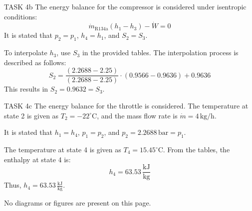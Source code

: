 TASK 4b  
The energy balance for the compressor is considered under isentropic conditions:  
\[
\dot{m}_{\text{R134a}} (h_1 - h_3) - \dot{W} = 0
\]  
It is stated that \( p_2 = p_1 \), \( h_4 = h_1 \), and \( S_2 = S_3 \).  

To interpolate \( h_3 \), use \( S_3 \) in the provided tables. The interpolation process is described as follows:  
\[
S_2 = \frac{(2.2688 - 2.25)}{(2.2688 - 2.25)} \cdot (0.9566 - 0.9636) + 0.9636
\]  
This results in \( S_2 = 0.9632 = S_3 \).  

TASK 4c  
The energy balance for the throttle is considered. The temperature at state 2 is given as \( T_2 = -22^\circ\text{C} \), and the mass flow rate is \( \dot{m} = 4 \, \text{kg/h} \).  

It is stated that \( h_1 = h_4 \), \( p_1 = p_2 \), and \( p_2 = 2.2688 \, \text{bar} = p_1 \).  

The temperature at state 4 is given as \( T_4 = 15.45^\circ\text{C} \). From the tables, the enthalpy at state 4 is:  
\[
h_4 = 63.53 \, \frac{\text{kJ}}{\text{kg}}
\]  
Thus, \( h_4 = 63.53 \, \frac{\text{kJ}}{\text{kg}} \).  

No diagrams or figures are present on this page.